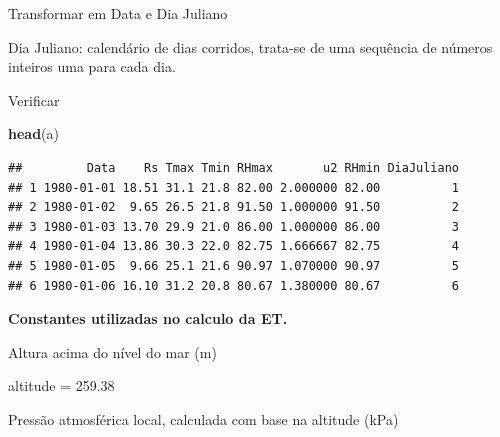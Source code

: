\documentclass[
]{book}
\newenvironment{Shaded}{\begin{snugshade}}{\end{snugshade}}
\newcommand{\DataTypeTok}[1]{\textcolor[rgb]{0.13,0.29,0.53}{#1}}
\newcommand{\FloatTok}[1]{\textcolor[rgb]{0.00,0.00,0.81}{#1}}
\newcommand{\KeywordTok}[1]{\textcolor[rgb]{0.13,0.29,0.53}{\textbf{#1}}}
\newcommand{\NormalTok}[1]{#1}
\newcommand{\OperatorTok}[1]{\textcolor[rgb]{0.81,0.36,0.00}{\textbf{#1}}}
\newcommand{\StringTok}[1]{\textcolor[rgb]{0.31,0.60,0.02}{#1}}
\begin{document}
Transformar em Data e Dia Juliano

\begin{Shaded}
\end{Shaded}

Dia Juliano: calendário de dias corridos, trata-se de uma sequência de números inteiros uma para cada dia.

\begin{Shaded}
\end{Shaded}

Verificar

\begin{Shaded}
\begin{Highlighting}[]
\KeywordTok{head}\NormalTok{(a)}
\end{Highlighting}
\end{Shaded}

\begin{verbatim}
##         Data    Rs Tmax Tmin RHmax       u2 RHmin DiaJuliano
## 1 1980-01-01 18.51 31.1 21.8 82.00 2.000000 82.00          1
## 2 1980-01-02  9.65 26.5 21.8 91.50 1.000000 91.50          2
## 3 1980-01-03 13.70 29.9 21.0 86.00 1.000000 86.00          3
## 4 1980-01-04 13.86 30.3 22.0 82.75 1.666667 82.75          4
## 5 1980-01-05  9.66 25.1 21.6 90.97 1.070000 90.97          5
## 6 1980-01-06 16.10 31.2 20.8 80.67 1.380000 80.67          6
\end{verbatim}

\textbf{Constantes utilizadas no calculo da ET.}

Altura acima do nível do mar (m)

\begin{Shaded}
\begin{Highlighting}[]
\NormalTok{altitude =}\StringTok{ }\FloatTok{259.38} 
\end{Highlighting}
\end{Shaded}

Pressão atmosférica local, calculada com base na altitude (kPa)
\end{document}
